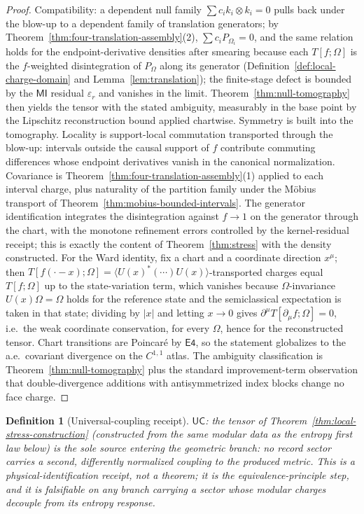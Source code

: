 \documentclass[11pt]{article}
\newtheorem{definition}[theorem]{Definition}
\begin{document}
\begin{proof}
Compatibility: a dependent null family \(\sum c_ik_i\otimes k_i=0\) pulls back
under the blow-up to a dependent family of translation generators; by
Theorem~\ref{thm:four-translation-assembly}(2), \(\sum c_iP_{\Omega_i}=0\),
and the same relation holds for the endpoint-derivative densities after
smearing because each \(T[f;\Omega]\) is the \(f\)-weighted disintegration of
\(P_\Omega\) along its generator (Definition~\ref{def:local-charge-domain}
and Lemma~\ref{lem:translation}); the finite-stage defect is bounded by the
\(\mathsf{MI}\) residual \(\varepsilon_r\) and vanishes in the limit.
Theorem~\ref{thm:null-tomography} then yields the tensor with the stated
ambiguity, measurably in the base point by the Lipschitz reconstruction
bound applied chartwise. Symmetry is built into the tomography. Locality is
support-local commutation transported through the blow-up: intervals outside
the causal support of \(f\) contribute commuting differences whose endpoint
derivatives vanish in the canonical normalization. Covariance is
Theorem~\ref{thm:four-translation-assembly}(1) applied to each interval
charge, plus naturality of the partition family under the M\"obius transport
of Theorem~\ref{thm:mobius-bounded-intervals}. The generator identification
integrates the disintegration against \(f\to1\) on the generator through the
chart, with the monotone refinement errors controlled by the kernel-residual
receipt; this is exactly the content of Theorem~\ref{thm:stress} with the
density constructed. For the Ward identity, fix a chart and a coordinate
direction \(x^\mu\); then
\(T[f(\cdot-x);\Omega]=\langle U(x)^{*}(\cdots)U(x)\rangle\)-transported
charges equal \(T[f;\Omega]\) up to the state-variation term, which vanishes
because \(\Omega\)-invariance \(U(x)\Omega=\Omega\) holds for the reference
state and the semiclassical expectation is taken in that state; dividing by
\(|x|\) and letting \(x\to0\) gives \(\partial^\mu T[\partial_\mu f;\Omega]=0\),
i.e.\ the weak coordinate conservation, for every \(\Omega\), hence for the
reconstructed tensor. Chart transitions are Poincar\'e by \(\mathsf{E4}\), so
the statement globalizes to the a.e.\ covariant divergence on the
\(C^{1,1}\) atlas. The ambiguity classification is
Theorem~\ref{thm:null-tomography} plus the standard improvement-term
observation that double-divergence additions with antisymmetrized index
blocks change no face charge.
\end{proof}

\begin{definition}[Universal-coupling receipt]
\label{def:universal-coupling-receipt}
\(\mathsf{UC}\): the tensor of Theorem~\ref{thm:local-stress-construction}
(constructed from the \emph{same} modular data as the entropy first law
below) is the sole source entering the geometric branch: no record sector
carries a second, differently normalized coupling to the produced metric.
This is a physical-identification receipt, not a theorem; it is the
equivalence-principle step, and it is falsifiable on any branch carrying a
sector whose modular charges decouple from its entropy response.
\end{definition}
\end{document}
